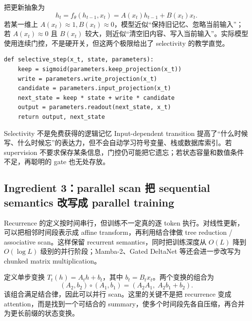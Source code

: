 
把更新抽象为
\[
h_t=f_\theta(h_{t-1},x_t)
=A(x_t)h_{t-1}+B(x_t)x_t.
\]
若某一维上 $A(x_t)\approx 1,B(x_t)\approx 0$，模型近似“保持旧记忆、忽略当前输入”；若 $A(x_t)\approx 0$ 且 $B(x_t)$ 较大，则近似“清空旧内容、写入当前输入”。实际模型使用连续门控，不是硬开关，但这两个极限给出了 selectivity 的教学直觉。

\begin{lstlisting}[caption={Selective recurrent update 的教学版伪代码}]
def selective_step(x_t, state, parameters):
    keep = sigmoid(parameters.keep_projection(x_t))
    write = parameters.write_projection(x_t)
    candidate = parameters.input_projection(x_t)
    next_state = keep * state + write * candidate
    output = parameters.readout(next_state, x_t)
    return output, next_state
\end{lstlisting}

\begin{warningbox}{Selectivity 不是免费获得的逻辑记忆}
Input-dependent transition 提高了“什么时候写、什么时候忘”的表达力，但不会自动学习符号变量、栈或数据库索引。若 supervision 不要求保存某条信息，门控仍可能把它遗忘；若状态容量和数值条件不足，再聪明的 gate 也无处存放。
\end{warningbox}

\subsection{Ingredient 3：parallel scan 把 sequential semantics 改写成 parallel training}

Recurrence 的定义按时间串行，但训练不一定真的逐 token 执行。对线性更新，可以把相邻时间段表示成 affine transform，再利用结合律做 tree reduction / associative scan。这样保留 recurrent semantics，同时把训练深度从 $O(L)$ 降到 $O(\log L)$ 级别的并行阶段；Mamba-2、Gated DeltaNet 等还会进一步改写为 chunked matrix multiplication。


定义单步变换 $T_t(h)=A_t h+b_t$，其中 $b_t=B_t x_t$。两个变换的组合为
\[
(A_2,b_2)\circ(A_1,b_1)
=\left(A_2A_1,\;A_2b_1+b_2\right).
\]
该组合满足结合律，因此可以并行 scan。这里的关键不是把 recurrence 变成 attention，而是找到一个可结合的 summary，使多个时间段先各自压缩，再合并为更长前缀的状态变换。

